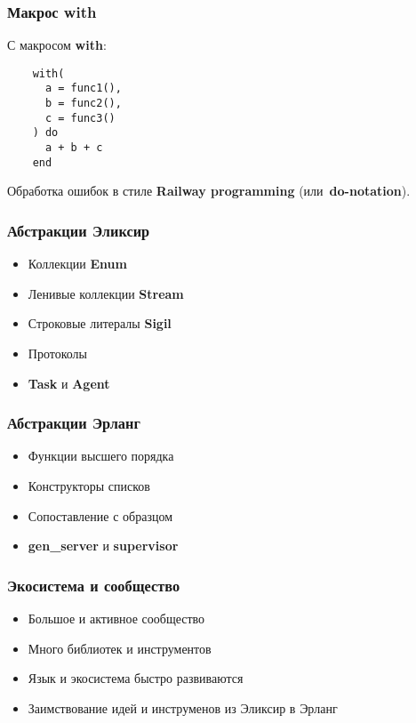 \documentclass[10pt]{beamer}
\begin{document}
\begin{frame}[fragile]
  \frametitle{Макрос with}
  С макросом \textbf{with}:
  \begin{lstlisting}
    with(
      a = func1(),
      b = func2(),
      c = func3()
    ) do
      a + b + c
    end
  \end{lstlisting}
  Обработка ошибок в стиле \textbf{Railway programming} (или~\textbf{do-notation}).
\end{frame}

\begin{frame}
  \frametitle{Абстракции Эликсир}
  \begin{itemize}
  \item Коллекции \textbf{Enum}
  \item Ленивые коллекции \textbf{Stream}
  \item Строковые литералы \textbf{Sigil}
  \item Протоколы
  \item \textbf{Task} и \textbf{Agent}
  \end{itemize}
\end{frame}

\begin{frame}
  \frametitle{Абстракции Эрланг}
  \begin{itemize}
  \item Функции высшего порядка
  \item Конструкторы списков
  \item Сопоставление с образцом
  \item \textbf{gen\_server} и \textbf{supervisor}
  \end{itemize}
\end{frame}

\begin{frame}
  \frametitle{Экосистема и сообщество}
  \begin{itemize}
  \item Большое и активное сообщество
  \item Много библиотек и инструментов
  \item Язык и экосистема быстро развиваются
  \item Заимствование идей и инструменов из Эликсир в Эрланг
  \end{itemize}
\end{frame}
\end{document}
